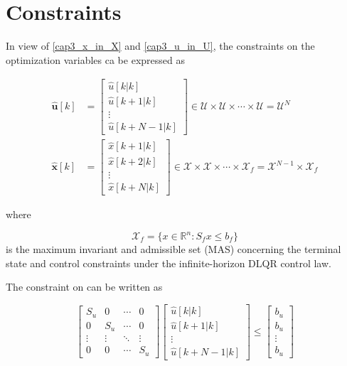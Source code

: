 
\section{Constraints}

In view of \eqref{cap3_x_in_X} and \eqref{cap3_u_in_U}, the constraints on the optimization variables ca be expressed as

\noindent
\begin{align}
	\mathbf{\hat{u}}[k]&= \left[
		\begin{matrix}
			\hat{u}[k | k] \\
			\hat{u}[k + 1 | k] \\
			\vdots \\
			\hat{u}[k + N-1 | k]
		\end{matrix}
	\right]
	\in \mathcal{U} \times  \mathcal{U} \times \cdots \times \mathcal{U} = \mathcal{U}^N \\
		\mathbf{\hat{x}}[k] &= \left[
		\begin{matrix}
			\hat{x}[k + 1 | k] \\
			\hat{x}[k + 2 | k] \\
			\vdots \\
			\hat{x}[k + N | k]
		\end{matrix}
	\right]
	\in \mathcal{X} \times  \mathcal{X} \times \cdots \times \mathcal{X}_f = \mathcal{X}^{N-1} \times \mathcal{X}_f
\end{align}

\noindent
where

\noindent
\begin{equation}
	\mathcal{X}_f = \big\{x \in \mathbb{R}^n : S_f x \le b_f \big\}
\end{equation}
is the maximum invariant and admissible set (MAS) concerning the terminal state and control
constraints under the infinite-horizon DLQR control law.

The constraint on  can be  written as

\noindent
\begin{equation}
	\left[
		\begin{matrix}
			S_u & 0 & \cdots & 0 \\
			0 & S_u & \cdots & 0 \\
			\vdots & \vdots & \ddots & \vdots \\
			0 & 0 & \cdots & S_u
		\end{matrix}
	\right]
	\left[
		\begin{matrix}
			\hat{u}[k | k] \\
			\hat{u}[k + 1 | k] \\
			\vdots \\
			\hat{u}[k + N-1 | k]
		\end{matrix}
	\right]
	\leq
	\left[
		\begin{matrix}
			b_u \\
			b_u \\
			\vdots \\
			b_u
		\end{matrix}
	\right]
\end{equation}

